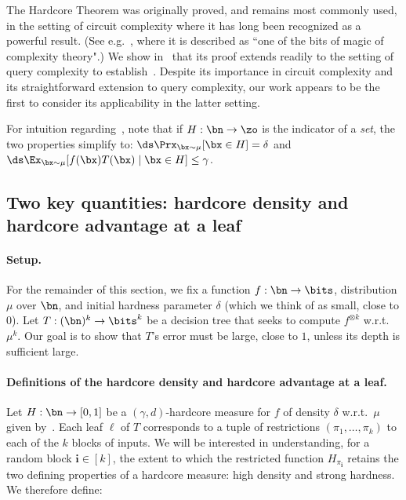 \documentclass[11pt]{article}
\begin{document}
The Hardcore Theorem was originally proved, and remains most commonly used, in the setting of circuit complexity where it has long been recognized as a powerful result. (See e.g.~\cite{Tre07}, where it is described as ``one of the bits of magic of complexity theory".) We show in~ that its proof extends readily to the setting of query complexity to establish~.  Despite its importance in circuit complexity and its straightforward extension to query complexity, our work appears to be the first to consider its applicability in the latter setting. 



\begin{remark}
For intuition regarding~, note that if $H : \bn \to \zo$ is the indicator of a {\sl set}, the two properties simplify to: 
 $\ds \Prx_{\bx \sim \mu}[\bx \in H] = \delta$ and 
$ \ds \Ex_{\bx\sim \mu}[f(\bx)T(\bx) \mid \bx \in H] \le \gamma$. 
    \end{remark}


    
\subsection{Two key quantities: hardcore density and hardcore advantage at a leaf}

\paragraph{Setup.} For the remainder of this section, we fix a function $f : \bn\to\bits$, distribution $\mu$ over $\bn$, and initial hardness parameter $\delta$ (which we think of as small, close to $0$). Let $T : (\bn)^k \to \bits^k$ be a decision tree that seeks to compute $f^{\otimes k}$ w.r.t.~$\mu^k$.   Our goal is to show that $T$'s error must be large, close to $1$, unless its depth is sufficient large.

\paragraph{Definitions of the hardcore density and hardcore advantage at a leaf.} Let $H : \bn\to [0,1]$ be a $(\gamma,d)$-hardcore measure for $f$ of density $\delta$ w.r.t.~$\mu$ given by~.  Each leaf $\ell$ of $T$ corresponds to a tuple of restrictions $(\pi_1,\ldots,\pi_k)$ to each of the $k$ blocks of inputs. We will be interested in understanding, for a random block $\boldsymbol{i}\in [k]$, the extent to which the restricted function $H_{\pi_{\boldsymbol{i}}}$ retains the two defining properties of a hardcore measure: high density and strong hardness. We therefore define: 
\end{document}
